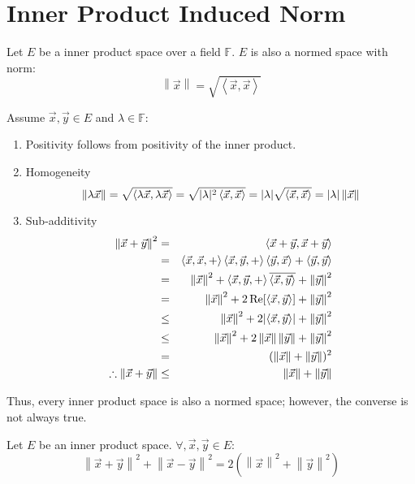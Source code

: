 \documentclass[letterpaper,12pt,fleqn]{article}
\newcommand{\norm}[1]{\left\|#1\right\|}
\newcommand{\inner}[2]{\left<#1,#2\right>}
\newcommand{\vx}{\vec{x}}
\newcommand{\vy}{\vec{y}}
\newcommand{\F}{\mathbb{F}}
\renewcommand{\l}{\lambda}
\newcommand{\conj}[1]{\overline{#1}}
\DeclareMathOperator{\Real}{Re}
\begin{document}
\section*{Inner Product Induced Norm}

\begin{theorem}
  Let $E$ be a inner product space over a field $\F$. $E$ is also a normed
  space with norm:
  \[\norm{\vx}=\sqrt{\inner{\vx}{\vx}}\]
\end{theorem}

\begin{theproof}
  Assume $\vx,\vy\in E$ and $\l\in\F$:
  \begin{enumerate}
  \item Positivity follows from positivity of the inner product.

  \item Homogeneity
    \[\norm{\l\vx}=\sqrt{\inner{\l\vx}{\l\vx}}=
    \sqrt{\abs{\l}^2\inner{\vx}{\vx}}=\abs{\l}\sqrt{\inner{\vx}{\vx}}=
    \abs{\l}\norm{\vx}\]

  \item Sub-additivity
    \begin{eqnarray*}
      \norm{\vx+\vy}^2 &=& \inner{\vx+\vy}{\vx+\vy} \\
      &=& \inner{\vx,\vx}+\inner{\vx,\vy}+\inner{\vy}{\vx}+\inner{\vy}{\vy} \\
      &=& \norm{\vx}^2+\inner{\vx,\vy}+\conj{\inner{\vx}{\vy}}+\norm{\vy}^2 \\
      &=& \norm{\vx}^2+2\Real[\inner{\vx}{\vy}]+\norm{\vy}^2 \\
      &\le& \norm{\vx}^2+2\abs{\inner{\vx}{\vy}}+\norm{\vy}^2 \\
      &\le& \norm{\vx}^2+2\norm{\vx}\norm{\vy}+\norm{\vy}^2 \\
      &=& (\norm{\vx}+\norm{\vy})^2 \\
      \therefore\norm{\vx+\vy} &\le& \norm{\vx}+\norm{\vy}
    \end{eqnarray*}
  \end{enumerate}
\end{theproof}

Thus, every inner product space is also a normed space; however, the converse
is not always true.

\begin{theorem}
  Let $E$ be an inner product space. $\forall,\vx,\vy\in E$:
  \[\norm{\vx+\vy}^2+\norm{\vx-\vy}^2=2\left(\norm{\vx}^2+\norm{\vy}^2\right)\]
\end{theorem}
\end{document}
